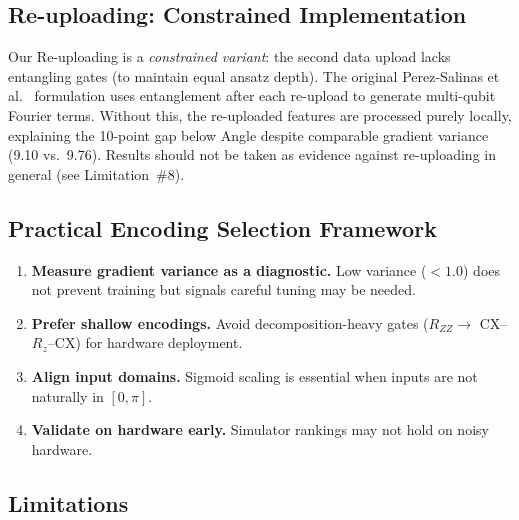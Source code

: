 \documentclass[conference,onecolumn,11pt]{IEEEtran}
\begin{document}
\subsection{Re-uploading: Constrained Implementation}
\label{sec:reupload_discussion}

Our Re-uploading is a \emph{constrained variant}: the second data upload lacks entangling gates (to maintain equal ansatz depth). The original Perez-Salinas et al.~\cite{perez2020} formulation uses entanglement after each re-upload to generate multi-qubit Fourier terms. Without this, the re-uploaded features are processed purely locally, explaining the 10-point gap below Angle despite comparable gradient variance (9.10 vs.\ 9.76). Results should not be taken as evidence against re-uploading in general (see Limitation~\#8).

\subsection{Practical Encoding Selection Framework}

\begin{enumerate}
\item \textbf{Measure gradient variance as a diagnostic.} Low variance ($<1.0$) does not prevent training but signals careful tuning may be needed.
\item \textbf{Prefer shallow encodings.} Avoid decomposition-heavy gates ($R_{ZZ} \rightarrow$ CX--$R_z$--CX) for hardware deployment.
\item \textbf{Align input domains.} Sigmoid scaling is essential when inputs are not naturally in $[0, \pi]$.
\item \textbf{Validate on hardware early.} Simulator rankings may not hold on noisy hardware.
\end{enumerate}

\subsection{Limitations}
\end{document}
